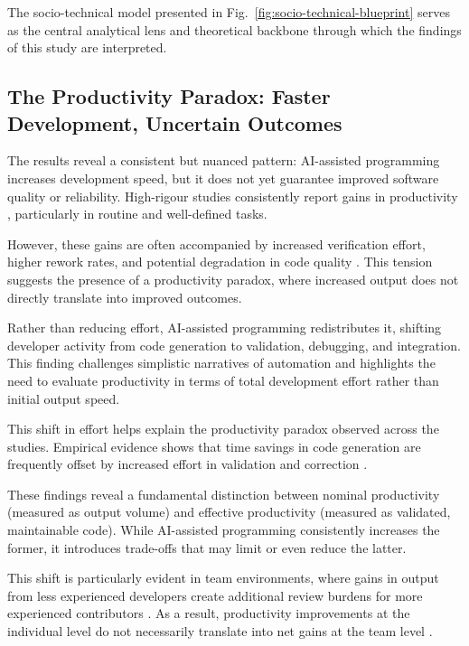 \documentclass[conference]{IEEEtran}
\begin{document}
The socio-technical model presented in Fig.~\ref{fig:socio-technical-blueprint} serves as the central analytical lens and theoretical backbone through which the findings of this study are interpreted.

\subsection{The Productivity Paradox: Faster Development, Uncertain Outcomes}

The results reveal a consistent but nuanced pattern: AI-assisted programming increases development speed, but it does not yet guarantee improved software quality or reliability. High-rigour studies consistently report gains in productivity \cite{cui_productivity_2024, xu_ai-assisted_2026, kumar_intuition_2025}, particularly in routine and well-defined tasks.

However, these gains are often accompanied by increased verification effort, higher rework rates, and potential degradation in code quality \cite{sandoval_lost_2022, zhong_developer-llm_2025}. This tension suggests the presence of a productivity paradox, where increased output does not directly translate into improved outcomes.

Rather than reducing effort, AI-assisted programming redistributes it, shifting developer activity from code generation to validation, debugging, and integration. This finding challenges simplistic narratives of automation and highlights the need to evaluate productivity in terms of total development effort rather than initial output speed.

This shift in effort helps explain the productivity paradox observed across the studies. Empirical evidence shows that time savings in code generation are frequently offset by increased effort in validation and correction \cite{cotroneo_automating_2024, fakhoury_llm-based_2024, eibl_exploring_2025}.

These findings reveal a fundamental distinction between nominal productivity (measured as output volume) and effective productivity (measured as validated, maintainable code). While AI-assisted programming consistently increases the former, it introduces trade-offs that may limit or even reduce the latter.

This shift is particularly evident in team environments, where gains in output from less experienced developers create additional review burdens for more experienced contributors \cite{xu_ai-assisted_2026, koripalli_copilot_2025, kumar_intuition_2025}. As a result, productivity improvements at the individual level do not necessarily translate into net gains at the team level \cite{xu_ai-assisted_2026}.
\end{document}
